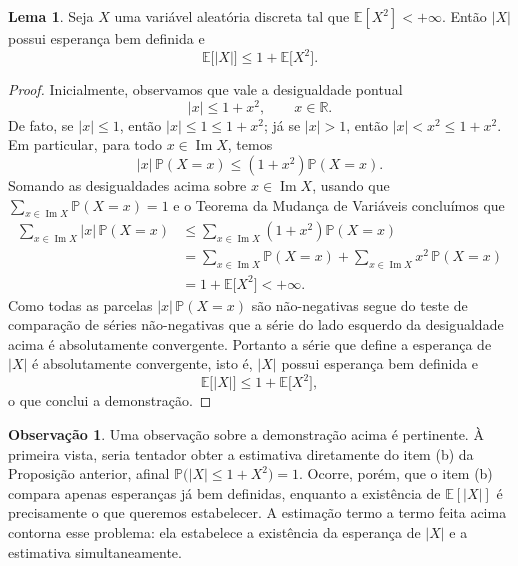 \documentclass[12pt,portuguese]{article}
\theoremstyle{definition}
\newtheorem{lemma}[lemma]{Lema}
\newtheorem{remark}[remark]{Observação}
\begin{document}
\begin{lemma}\label{lem:momento-quadrado-implica-modulo}
Seja $X$ uma variável aleatória discreta tal que $\mathbb{E}[X^{2}]<+\infty$.
Então $|X|$ possui esperança bem definida e
\[
\mathbb{E}\bigl[|X|\bigr] \leqslant 1+\mathbb{E}\bigl[X^{2}\bigr].
\]
\end{lemma}

\begin{proof}
Inicialmente, observamos que vale a desigualdade pontual
\[
|x| \leqslant 1+x^{2}, \qquad x \in \mathbb{R}.
\]
De fato, se $|x|\leqslant 1$, então $|x|\leqslant 1\leqslant 1+x^{2}$; já se $|x|>1$,
então $|x|<x^{2}\leqslant 1+x^{2}$. Em particular, para todo $x \in \operatorname{Im} X$, temos
\[
|x|\,\mathbb{P}(X=x) \leqslant \left(1+x^{2}\right)\mathbb{P}(X=x).
\]
Somando as desigualdades acima sobre $x \in \operatorname{Im} X$, usando que
$\sum_{x \in \operatorname{Im} X}\mathbb{P}(X=x)=1$ e o Teorema da Mudança de Variáveis 
concluímos que
\begin{align*}
\sum_{x \in \operatorname{Im} X}|x|\,\mathbb{P}(X=x)
&\leqslant
\sum_{x \in \operatorname{Im} X}\left(1+x^{2}\right)\mathbb{P}(X=x)
\\[0.4cm]
&=
\sum_{x \in \operatorname{Im} X}\mathbb{P}(X=x)
+
\sum_{x \in \operatorname{Im} X}x^{2}\,\mathbb{P}(X=x)
\\[0.4cm]
&=
1+\mathbb{E}\bigl[X^{2}\bigr]
<
+\infty.
\end{align*}
Como todas as parcelas $|x|\,\mathbb{P}(X=x)$ são não-negativas segue do teste de comparação
de séries não-negativas que a série do lado esquerdo da desigualdade acima é absolutamente convergente. 
Portanto a série que define
a esperança de $|X|$ é absolutamente convergente, isto é, $|X|$ possui esperança bem definida e
\[
\mathbb{E}\bigl[|X|\bigr]\leqslant 1+\mathbb{E}\bigl[X^{2}\bigr],
\]
o que conclui a demonstração.
\end{proof}

\begin{remark}
Uma observação sobre a demonstração acima é pertinente. À primeira vista, seria tentador
obter a estimativa diretamente do item (b) da Proposição anterior, afinal
$\mathbb{P}\bigl(|X|\leqslant 1+X^{2}\bigr)=1$. Ocorre, porém, que o item (b) compara apenas
esperanças já bem definidas, enquanto a existência de $\mathbb{E}[|X|]$ é precisamente o que
queremos estabelecer. A estimação termo a termo feita acima contorna esse problema: ela
estabelece a existência da esperança de $|X|$ e a estimativa simultaneamente.
\end{remark}
\end{document}
